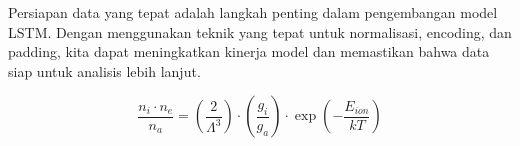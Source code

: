 \par Persiapan data yang tepat adalah langkah penting dalam pengembangan model LSTM. Dengan menggunakan teknik yang tepat untuk normalisasi, encoding, dan padding, kita dapat meningkatkan kinerja model dan memastikan bahwa data siap untuk analisis lebih lanjut.


$$\frac{n_i \cdot n_e}{n_a} = \left( \frac{2}{\Lambda^3} \right) \cdot \left( \frac{g_i}{g_a} \right) \cdot \exp \left( -\frac{E_{ion}}{kT} \right)$$

